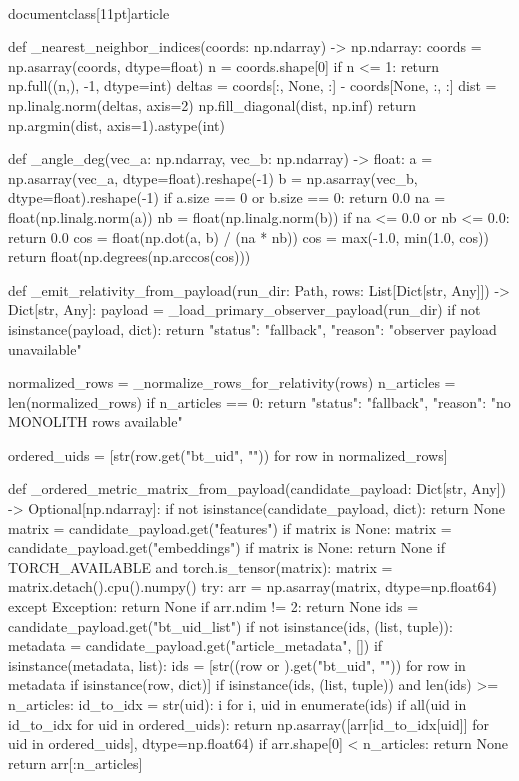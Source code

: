 \\documentclass[11pt]{article}
\begin{document}
\begin{CodeBlock}
def _nearest_neighbor_indices(coords: np.ndarray) -> np.ndarray:
    coords = np.asarray(coords, dtype=float)
    n = coords.shape[0]
    if n <= 1:
        return np.full((n,), -1, dtype=int)
    deltas = coords[:, None, :] - coords[None, :, :]
    dist = np.linalg.norm(deltas, axis=2)
    np.fill_diagonal(dist, np.inf)
    return np.argmin(dist, axis=1).astype(int)


def _angle_deg(vec_a: np.ndarray, vec_b: np.ndarray) -> float:
    a = np.asarray(vec_a, dtype=float).reshape(-1)
    b = np.asarray(vec_b, dtype=float).reshape(-1)
    if a.size == 0 or b.size == 0:
        return 0.0
    na = float(np.linalg.norm(a))
    nb = float(np.linalg.norm(b))
    if na <= 0.0 or nb <= 0.0:
        return 0.0
    cos = float(np.dot(a, b) / (na * nb))
    cos = max(-1.0, min(1.0, cos))
    return float(np.degrees(np.arccos(cos)))


def _emit_relativity_from_payload(run_dir: Path, rows: List[Dict[str, Any]]) -> Dict[str, Any]:
    payload = _load_primary_observer_payload(run_dir)
    if not isinstance(payload, dict):
        return {"status": "fallback", "reason": "observer payload unavailable"}

    normalized_rows = _normalize_rows_for_relativity(rows)
    n_articles = len(normalized_rows)
    if n_articles == 0:
        return {"status": "fallback", "reason": "no MONOLITH rows available"}

    ordered_uids = [str(row.get("bt_uid", "")) for row in normalized_rows]

    def _ordered_metric_matrix_from_payload(candidate_payload: Dict[str, Any]) -> Optional[np.ndarray]:
        if not isinstance(candidate_payload, dict):
            return None
        matrix = candidate_payload.get("features")
        if matrix is None:
            matrix = candidate_payload.get("embeddings")
        if matrix is None:
            return None
        if TORCH_AVAILABLE and torch.is_tensor(matrix):
            matrix = matrix.detach().cpu().numpy()
        try:
            arr = np.asarray(matrix, dtype=np.float64)
        except Exception:
            return None
        if arr.ndim != 2:
            return None
        ids = candidate_payload.get("bt_uid_list")
        if not isinstance(ids, (list, tuple)):
            metadata = candidate_payload.get("article_metadata", [])
            if isinstance(metadata, list):
                ids = [str((row or {}).get("bt_uid", "")) for row in metadata if isinstance(row, dict)]
        if isinstance(ids, (list, tuple)) and len(ids) >= n_articles:
            id_to_idx = {str(uid): i for i, uid in enumerate(ids)}
            if all(uid in id_to_idx for uid in ordered_uids):
                return np.asarray([arr[id_to_idx[uid]] for uid in ordered_uids], dtype=np.float64)
        if arr.shape[0] < n_articles:
            return None
        return arr[:n_articles]


\end{CodeBlock}
\end{document}
